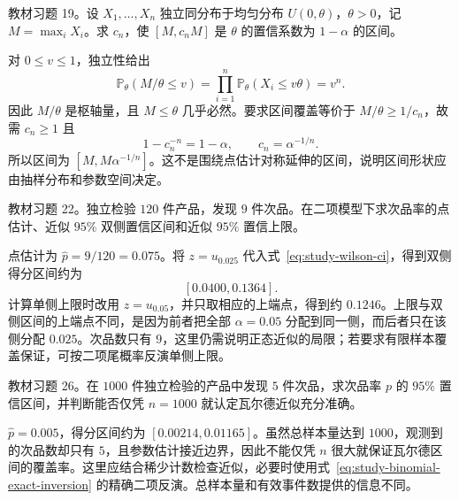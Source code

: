 \begin{example}
\label{ex:study-ci-exercise-uniform-maximum}
教材习题 19。设 $X_1,\ldots,X_n$ 独立同分布于均匀分布 $U(0,\theta)$，$\theta>0$，记 $M=\max_iX_i$。求 $c_n$，使 $[M,c_nM]$ 是 $\theta$ 的置信系数为 $1-\alpha$ 的区间。
\end{example}
\begin{solve}
对 $0\le v\le1$，独立性给出
\[
  \mathbb P_\theta(M/\theta\le v)
   =\prod_{i=1}^n\mathbb P_\theta(X_i\le v\theta)=v^n.
\]
因此 $M/\theta$ 是枢轴量，且 $M\le\theta$ 几乎必然。要求区间覆盖等价于 $M/\theta\ge1/c_n$，故需 $c_n\ge1$ 且
\[
  1-c_n^{-n}=1-\alpha,
  \qquad c_n=\alpha^{-1/n}.
\]
所以区间为 $[M,M\alpha^{-1/n}]$。这不是围绕点估计对称延伸的区间，说明区间形状应由抽样分布和参数空间决定。
\end{solve}

\begin{example}
\label{ex:study-ci-exercise-defects-bound}
教材习题 22。独立检验 $120$ 件产品，发现 $9$ 件次品。在二项模型下求次品率的点估计、近似 $95\%$ 双侧置信区间和近似 $95\%$ 置信上限。
\end{example}
\begin{solve}
点估计为 $\widehat p=9/120=0.075$。将 $z=u_{0.025}$ 代入式~\eqref{eq:study-wilson-ci}，得到双侧得分区间约为
\[
  [0.0400,0.1364].
\]
计算单侧上限时改用 $z=u_{0.05}$，并只取相应的上端点，得到约 $0.1246$。上限与双侧区间的上端点不同，是因为前者把全部 $\alpha=0.05$ 分配到同一侧，而后者只在该侧分配 $0.025$。次品数只有 $9$，这里仍需说明正态近似的局限；若要求有限样本覆盖保证，可按二项尾概率反演单侧上限。
\end{solve}

\begin{example}
\label{ex:study-ci-exercise-rare-defects}
教材习题 26。在 $1000$ 件独立检验的产品中发现 $5$ 件次品，求次品率 $p$ 的 $95\%$ 置信区间，并判断能否仅凭 $n=1000$ 就认定瓦尔德近似充分准确。
\end{example}
\begin{solve}
$\widehat p=0.005$，得分区间约为 $[0.00214,0.01165]$。虽然总样本量达到 $1000$，观测到的次品数却只有 $5$，且参数估计接近边界，因此不能仅凭 $n$ 很大就保证瓦尔德区间的覆盖率。这里应结合稀少计数检查近似，必要时使用式~\eqref{eq:study-binomial-exact-inversion} 的精确二项反演。总样本量和有效事件数提供的信息不同。
\end{solve}





